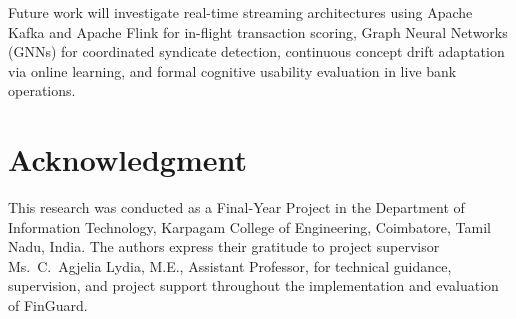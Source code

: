 \documentclass[conference]{IEEEtran}
\begin{document}
Future work will investigate real-time streaming architectures using Apache Kafka and Apache Flink for in-flight transaction scoring, Graph Neural Networks (GNNs) for coordinated syndicate detection, continuous concept drift adaptation via online learning, and formal cognitive usability evaluation in live bank operations.

\section*{Acknowledgment}
This research was conducted as a Final-Year Project in the Department of Information Technology, Karpagam College of Engineering, Coimbatore, Tamil Nadu, India. The authors express their gratitude to project supervisor Ms.~C.~Agjelia Lydia, M.E., Assistant Professor, for technical guidance, supervision, and project support throughout the implementation and evaluation of FinGuard.



\end{document}
